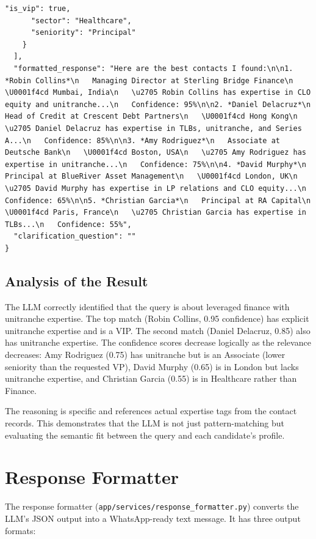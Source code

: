 \documentclass[12pt, a4paper]{report}
\begin{document}
\begin{lstlisting}[style=jsonstyle, caption={Live match result for leveraged finance query}]
      "is_vip": true,
      "sector": "Healthcare",
      "seniority": "Principal"
    }
  ],
  "formatted_response": "Here are the best contacts I found:\n\n1. *Robin Collins*\n   Managing Director at Sterling Bridge Finance\n   \U0001f4cd Mumbai, India\n   \u2705 Robin Collins has expertise in CLO equity and unitranche...\n   Confidence: 95%\n\n2. *Daniel Delacruz*\n   Head of Credit at Crescent Debt Partners\n   \U0001f4cd Hong Kong\n   \u2705 Daniel Delacruz has expertise in TLBs, unitranche, and Series A...\n   Confidence: 85%\n\n3. *Amy Rodriguez*\n   Associate at Deutsche Bank\n   \U0001f4cd Boston, USA\n   \u2705 Amy Rodriguez has expertise in unitranche...\n   Confidence: 75%\n\n4. *David Murphy*\n   Principal at BlueRiver Asset Management\n   \U0001f4cd London, UK\n   \u2705 David Murphy has expertise in LP relations and CLO equity...\n   Confidence: 65%\n\n5. *Christian Garcia*\n   Principal at RA Capital\n   \U0001f4cd Paris, France\n   \u2705 Christian Garcia has expertise in TLBs...\n   Confidence: 55%",
  "clarification_question": ""
}
\end{lstlisting}

\subsection{Analysis of the Result}

The LLM correctly identified that the query is about leveraged finance with unitranche expertise. The top match (Robin Collins, 0.95 confidence) has explicit unitranche expertise and is a VIP. The second match (Daniel Delacruz, 0.85) also has unitranche expertise. The confidence scores decrease logically as the relevance decreases: Amy Rodriguez (0.75) has unitranche but is an Associate (lower seniority than the requested VP), David Murphy (0.65) is in London but lacks unitranche expertise, and Christian Garcia (0.55) is in Healthcare rather than Finance.

The reasoning is specific and references actual expertise tags from the contact records. This demonstrates that the LLM is not just pattern-matching but evaluating the semantic fit between the query and each candidate's profile.

\section{Response Formatter}

The response formatter (\texttt{app/services/response\_formatter.py}) converts the LLM's JSON output into a WhatsApp-ready text message. It has three output formats:
\end{document}
